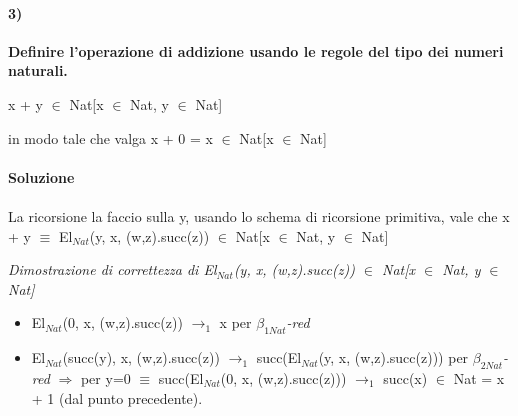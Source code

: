 \paragraph{3)}
\textbf{Definire l'operazione di addizione usando le regole del tipo dei numeri naturali.}
\begin{center} x + y $\in$ Nat[x $\in$ Nat, y $\in$ Nat]\end{center}
in modo tale che valga x + 0 = x $\in$  Nat[x $\in$ Nat]
\\\\
\textbf{Soluzione}\\\\
La ricorsione la faccio sulla y, usando lo schema di ricorsione primitiva, vale che x + y $\equiv$ El$_{Nat}$(y, x, (w,z).succ(z)) $\in$ Nat[x $\in$ Nat, y $\in$ Nat]


\tiny
\begin{adjustwidth}{-16em}{}
\begin{prooftree}
\end{prooftree}
\end{adjustwidth}
\noindent
\normalsize \textit{Dimostrazione di correttezza di El$_{Nat}$(y, x, (w,z).succ(z)) $\in$ Nat[x $\in$ Nat, y $\in$ Nat]}
\begin{itemize}
\item El$_{Nat}$(0, x, (w,z).succ(z))  $\rightarrow_1$ x per \textit{$\beta_{1Nat}$-red}
\item El$_{Nat}$(succ(y), x, (w,z).succ(z)) $\rightarrow_1$ succ(El$_{Nat}$(y, x, (w,z).succ(z))) per \textit{$\beta_{2Nat}$-red} $\Rightarrow$ per y=0 $\equiv$ succ(El$_{Nat}$(0, x, (w,z).succ(z))) $\rightarrow_1$ succ(x) $\in$ Nat = x + 1  (dal punto precedente).
\end{itemize}

